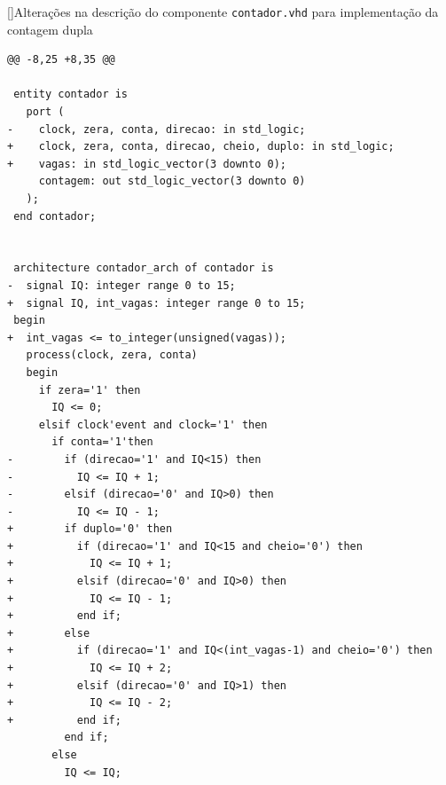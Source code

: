 \documentclass[a4,12pt]{horizon-theme}
\newenvironment{code}{\captionsetup{type=listing}}{}
\begin{document}
\newpage
\begin{code}
  []{Alterações na descrição do componente \texttt{contador.vhd} para implementação da contagem dupla\footnotemark}
  \label{lst:desafio_contador}
  \begin{verbatim}
@@ -8,25 +8,35 @@
 
 entity contador is
   port (
-    clock, zera, conta, direcao: in std_logic;
+    clock, zera, conta, direcao, cheio, duplo: in std_logic;
+    vagas: in std_logic_vector(3 downto 0);
     contagem: out std_logic_vector(3 downto 0)
   );
 end contador;
 
 
 architecture contador_arch of contador is
-  signal IQ: integer range 0 to 15;
+  signal IQ, int_vagas: integer range 0 to 15;
 begin
+  int_vagas <= to_integer(unsigned(vagas));
   process(clock, zera, conta)
   begin
     if zera='1' then
       IQ <= 0;
     elsif clock'event and clock='1' then    
       if conta='1'then
-        if (direcao='1' and IQ<15) then
-          IQ <= IQ + 1;
-        elsif (direcao='0' and IQ>0) then
-          IQ <= IQ - 1;
+        if duplo='0' then
+          if (direcao='1' and IQ<15 and cheio='0') then
+            IQ <= IQ + 1;
+          elsif (direcao='0' and IQ>0) then
+            IQ <= IQ - 1;
+          end if;
+        else
+          if (direcao='1' and IQ<(int_vagas-1) and cheio='0') then
+            IQ <= IQ + 2;
+          elsif (direcao='0' and IQ>1) then
+            IQ <= IQ - 2;
+          end if;
         end if;
       else
         IQ <= IQ;
\end{verbatim}
\end{code}





% 
% 

\horizonBackCover
\end{document}
